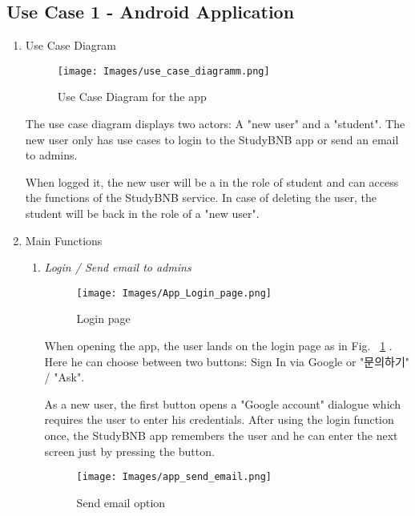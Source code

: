 \documentclass[conference]{IEEEtran}
\begin{document}
\subsection{Use Case 1 - Android Application}

\begin{enumerate}
    \item Use Case Diagram
    
    \begin{figure}[H]
    \centering
    \texttt{[image: Images/use\_case\_diagramm.png]}
    \caption{Use Case Diagram for the app}
\end{figure}

The use case diagram displays two actors: A "new user" and a "student". The new user only has use cases to login to the StudyBNB app or send an email to admins.

When logged it, the new user will be a in the role of student and can access the functions of the StudyBNB service. In case of deleting the user, the student will be back in the role of a "new user".\\

\item Main Functions

\begin{enumerate}
    \item \textit{Login / Send email to admins}
    
    \begin{figure}[htp]
    \centering
    \texttt{[image: Images/App\_Login\_page.png]}
    \caption{Login page}
    \label{figure:loginPage}
\end{figure}

    When opening the app, the user lands on the login page as in Fig. ~\ref{figure:loginPage} . Here he can choose between two buttons: Sign In via Google or "문의하기" / "Ask".
    
    As a new user, the first button opens a "Google account" dialogue which requires the user to enter his credentials. After using the login function once, the StudyBNB app remembers the user and he can enter the next screen just by pressing the button.

    \begin{figure}[htp]
    \centering
    \texttt{[image: Images/app\_send\_email.png]}
    \caption{Send email option}
    \label{figure:sendEmailPage}
\end{figure}
    


\end{enumerate}
\end{enumerate}
\end{document}
